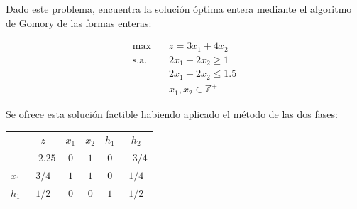 Dado este problema, encuentra la solución óptima entera mediante el algoritmo de Gomory de las formas enteras:

\begin{align*}
\max \quad & z = 3x_1 + 4x_2 \\
\text{s.a.} \quad & 2x_1 + 2x_2 \geq 1 \\
                  & 2x_1 + 2x_2 \leq 1.5 \\
                  & x_1, x_2  \in \mathbb{Z^+}
\end{align*}

Se ofrece esta solución factible habiendo aplicado el método de las dos fases:

\begin{center}
\begin{tabular}{c|c|cccc|}
 & $z$ & $x_1$ & $x_2$ & $h_1$ & $h_2$ \\ 
 & $-2.25$ & $0$ & $1$ & $0$ & $-3/4$  \\ 
\hline
$x_1$ & $3/4$ & $1$ & $1$ & $0$ & $1/4$ \\ 
$h_1$ & $1/2$ & $0$ & $0$ & $1$ & $1/2$ \\ 
\hline
\end{tabular}
\end{center}